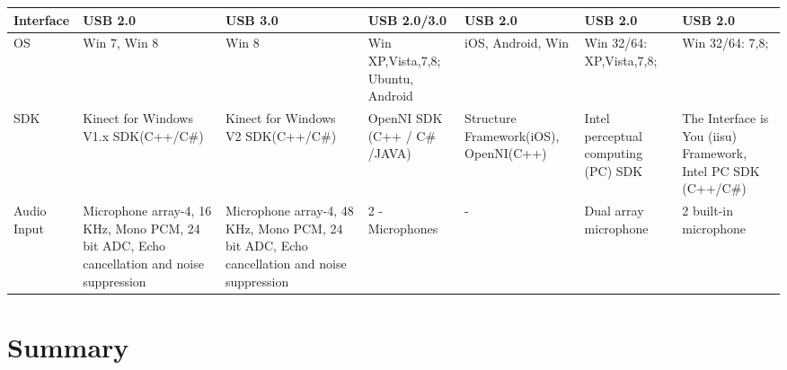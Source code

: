 \begin{landscape}
\begin{table}
\begin{tabularx}{600pt}{c*6{X}}
  \multicolumn{1}{l}{Interface}           & USB 2.0
  										 & USB 3.0
  										 & USB 2.0/3.0 
  										 & USB 2.0
  										 & USB 2.0
  										 & USB 2.0
  										 \tabularnewline\midrule	
  
  \multicolumn{1}{l}{OS}                 & Win 7, Win 8
  										 & Win 8
  										 & Win XP,Vista,7,8; Ubuntu, Android
  										 & iOS, Android, Win
  										 & Win 32/64: XP,Vista,7,8;
  										 & Win 32/64: 7,8; 
  										 \tabularnewline\midrule	
  										 										 								
  
  \multicolumn{1}{l}{SDK}                & Kinect for Windows V1.x SDK(C++/C\#)
  										 & Kinect for Windows V2 SDK(C++/C\#)
  										 & OpenNI SDK (C++ / C\# /JAVA)
  										 & Structure Framework(iOS), OpenNI(C++)
  										 & Intel perceptual computing (PC) SDK 
  										 & The Interface is You (iisu) Framework, Intel PC SDK (C++/C\#)
  										 \tabularnewline\midrule	
  										 
 \multicolumn{1}{l}{Audio Input}        &  Microphone array-4, 16 KHz, Mono PCM, 24 bit ADC, Echo cancellation        											and noise suppression 
  										&  Microphone array-4, 48 KHz, Mono PCM, 24 bit ADC, Echo cancellation        											and noise suppression 
  										&  2 - Microphones 
  										&  - 
  										&  Dual array microphone 
  										& 2 built-in microphone
  										\tabularnewline
  										\bottomrule
\end{tabularx}
\end{table}
\end{landscape}

\section{Summary}